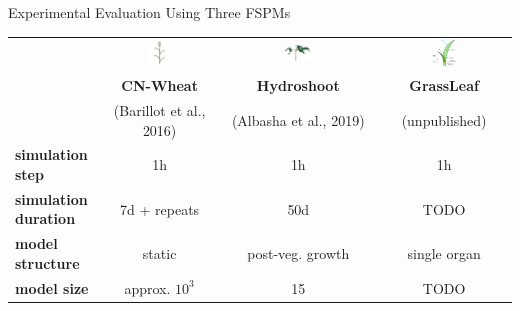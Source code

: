 \documentclass[final,aspectratio=169,12pt]{beamer}
\begin{document}
\begin{frame}{Experimental Evaluation Using Three FSPMs}

\centering
\begin{tabular}{lccc}
 & \includegraphics[width=0.2\textwidth]{figures/cnwheat} & \includegraphics[width=0.2\textwidth]{figures/hydroshoot} & \includegraphics[width=0.2\textwidth]{figures/GrassLeaf} \\
 & \textbf{CN-Wheat} & \textbf{Hydroshoot} & \textbf{GrassLeaf} \\
 & {\footnotesize (Barillot et al., 2016)} & {\footnotesize (Albasha et al., 2019)} & {\footnotesize (unpublished)} \\
\textbf{simulation step} & 1h & 1h & 1h \\
\textbf{simulation duration} & 7d + repeats & 50d & TODO \\
\textbf{model structure} & static & post-veg. growth & single organ \\
\textbf{model size} & approx. $10^3$ & 15 & TODO \\
\end{tabular}

\end{frame}
\end{document}
